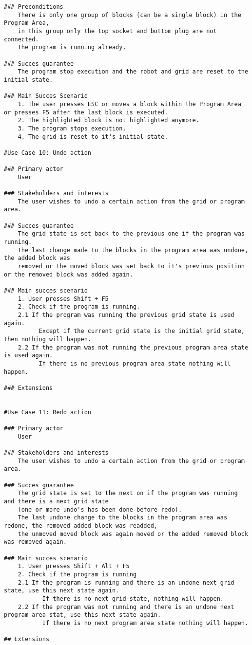 \documentclass{article}
\begin{document}
\begin{verbatim}
### Preconditions
    There is only one group of blocks (can be a single block) in the Program Area, 
    in this group only the top socket and bottom plug are not connected.
    The program is running already.

### Succes guarantee
    The program stop execution and the robot and grid are reset to the initial state.

### Main Succes Scenario
    1. The user presses ESC or moves a block within the Program Area or presses F5 after the last block is executed.
    2. The highlighted block is not highlighted anymore.
    3. The program stops execution.
    4. The grid is reset to it's initial state.

#Use Case 10: Undo action

### Primary actor
    User

### Stakeholders and interests
    The user wishes to undo a certain action from the grid or program area.

### Succes guarantee
    The grid state is set back to the previous one if the program was running.
    The last change made to the blocks in the program area was undone, the added block was
    removed or the moved block was set back to it's previous position or the removed block was added again.

### Main succes scenario
    1. User presses Shift + F5
    2. Check if the program is running.
    2.1 If the program was running the previous grid state is used again.
          Except if the current grid state is the initial grid state, then nothing will happen.
    2.2 If the program was not running the previous program area state is used again.
          If there is no previous program area state nothing will happen.
    
### Extensions


#Use Case 11: Redo action

### Primary actor
    User

### Stakeholders and interests
    The user wishes to undo a certain action from the grid or program area.

### Succes guarantee
    The grid state is set to the next on if the program was running and there is a next grid state 
    (one or more undo's has been done before redo).
    The last undone change to the blocks in the program area was redone, the removed added block was readded,
    the unmoved moved block was again moved or the added removed block was removed again.

### Main succes scenario
    1. User presses Shift + Alt + F5
    2. Check if the program is running
    2.1 If the program is running and there is an undone next grid state, use this next state again.
           If there is no next grid state, nothing will happen.
    2.2 If the program was not running and there is an undone next program area stat, use this next state again.
           If there is no next program area state nothing will happen.

## Extensions

\end{verbatim}
\end{document}
